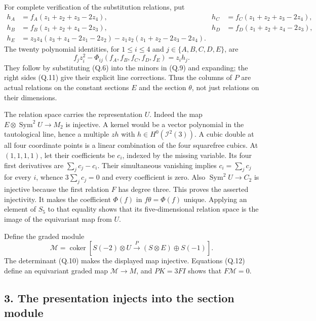 \documentclass[
  10pt,
]{article}
\begin{document}
For complete verification of the substitution relations, put \[
\begin{aligned}
h_A&=f_A(z_1+z_2+z_3-2z_4),&
h_C&=f_C(z_1+z_2+z_3-2z_4),\\
h_B&=f_B(z_1+z_2+z_4-2z_3),&
h_D&=f_D(z_1+z_2+z_4-2z_3),\\
h_E&=z_3z_4(z_3+z_4-2z_1-2z_2)
      -z_1z_2(z_1+z_2-2z_3-2z_4).
\end{aligned}
\tag{Q.11}
\] The twenty polynomial identities, for \(1\le i\le4\) and
\(j\in\{A,B,C,D,E\}\), are \[
f_jz_i^2-\Phi_{ij}(f_A,f_B,f_C,f_D,f_E)=z_i h_j.
\tag{Q.12}
\] They follow by substituting (Q.6) into the minors in (Q.9) and
expanding; the right sides (Q.11) give their explicit line corrections.
Thus the columns of \(P\) are actual relations on the constant sections
\(E\) and the section \(\theta\), not just relations on their
dimensions.

The relation space carries the representation \(U\). Indeed the map
\(E\otimes\operatorname{Sym}^2U\to M_2\) is injective. A kernel would be
a vector polynomial in the tautological line, hence a multiple \(z h\)
with \(h\in H^0(\mathcal I^2(3))\). A cubic double at all four
coordinate points is a linear combination of the four squarefree cubics.
At \((1,1,1,1)\), let their coefficients be \(c_i\), indexed by the
missing variable. Its four first derivatives are \(\sum_jc_j-c_i\).
Their simultaneous vanishing implies \(c_i=\sum_jc_j\) for every \(i\),
whence \(3\sum_jc_j=0\) and every coefficient is zero. Also
\(\operatorname{Sym}^2U\to C_2\) is injective because the first relation
\(F\) has degree three. This proves the asserted injectivity. It makes
the coefficient \(\Phi(f)\) in \(f\theta=\Phi(f)\) unique. Applying an
element of \(S_5\) to that equality shows that its five-dimensional
relation space is the image of the equivariant map from \(U\).

Define the graded module \[
\mathcal M=\operatorname{coker}\left[
S(-2)\otimes U\xrightarrow{P}
(S\otimes E)\oplus S(-1)\right].
\tag{Q.13}
\] The determinant (Q.10) makes the displayed map injective. Equations
(Q.12) define an equivariant graded map \(\mathcal M\to M\), and
\(PK=3FI\) shows that \(F\mathcal M=0\).

\subsection{3. The presentation injects into the section
module}\label{the-presentation-injects-into-the-section-module}
\end{document}
